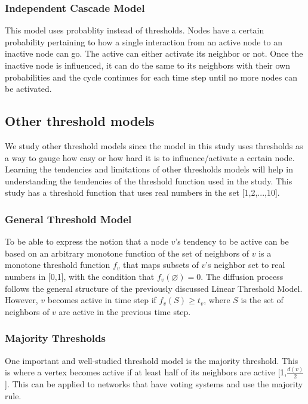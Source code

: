 \subsubsection{Independent Cascade Model}
This model uses probablity instead of thresholds. Nodes have a  certain probability pertaining to how a single interaction from an active node to an inactive node can go. The active can either activate its neighbor or not. Once the inactive node is influenced, it can do the same to its neighbors with their own probabilities and the cycle continues for each time step until no more nodes can be activated.\cite{Kempe}
\subsection{Other threshold models}
We study other threshold models since the model in this study uses thresholds as a way to gauge how easy or how hard it is to influence/activate a certain node. Learning the tendencies and limitations of other thresholds models will help in understanding the tendencies of the threshold function used in the study. This study has a threshold function that uses real numbers in the set [1,2,...,10].
\subsubsection{General Threshold Model}
To be able to express the notion that a node $v$'s tendency to be active can be based on an arbitrary monotone function of the set of neighbors of $v$ is a monotone threshold function $f_{v}$ that maps subsets of $v$'s neighbor set to real numbers in [0,1], with the condition that $f_{v}(\varnothing) = 0$. The diffusion process follows the general structure of the previously discussed Linear Threshold Model. However, $v$ becomes active in time step if $f_{v}(S) \geq t_{v}$, where $S$ is the set of neighbors of $v$ are active in the previous time step.\cite{Kempe}
\subsubsection{Majority Thresholds}
One important and well-studied threshold model is the majority threshold. This is where a vertex becomes active if at least half of its neighbors are active [1,$\frac{d(v)}{2}$].\cite{chen} This can be applied to networks that have voting systems and use the majority rule.
